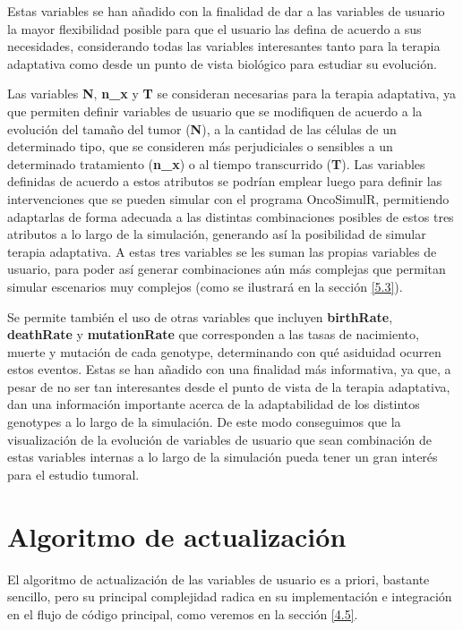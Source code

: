 Estas variables se han añadido con la finalidad de dar a las variables de usuario la mayor flexibilidad posible para que el usuario las defina de acuerdo a sus necesidades, considerando todas las variables interesantes tanto para la terapia adaptativa como desde un punto de vista biológico para estudiar su evolución.

Las variables \textbf{N}, \textbf{n\_x} y \textbf{T} se consideran necesarias para la terapia adaptativa, ya que permiten definir variables de usuario que se modifiquen de acuerdo a la evolución del tamaño del \gls{tumor} (\textbf{N}), a la cantidad de las células de un determinado tipo, que se consideren más perjudiciales o sensibles a un determinado tratamiento (\textbf{n\_x}) o al tiempo transcurrido (\textbf{T}). Las variables definidas de acuerdo a estos atributos se podrían emplear luego para definir las intervenciones que se pueden simular con el programa OncoSimulR\cite{OncoSimulR}, permitiendo adaptarlas de forma adecuada a las distintas combinaciones posibles de estos tres atributos a lo largo de la simulación, generando así la posibilidad de simular terapia adaptativa. A estas tres variables se les suman las propias variables de usuario, para poder así generar combinaciones aún más complejas que permitan simular escenarios muy complejos (como se ilustrará en la sección \ref{5.3}).

Se permite también el uso de otras variables que incluyen  \textbf{birthRate}, \textbf{deathRate} y \textbf{mutationRate} que corresponden a las tasas de nacimiento, muerte y mutación de cada \gls{genotype}, determinando con qué asiduidad ocurren estos eventos. Estas se han añadido con una finalidad más informativa, ya que, a pesar de no ser tan interesantes desde el punto de vista de la terapia adaptativa, dan una información importante acerca de la adaptabilidad de los distintos \glspl{genotype} a lo largo de la simulación. De este modo conseguimos que la visualización de la evolución de variables de usuario que sean combinación de estas variables internas a lo largo de la simulación pueda tener un gran interés para el estudio tumoral.

\section{Algoritmo de actualización}\label{3.4}

El algoritmo de actualización de las variables de usuario es a priori, bastante sencillo, pero su principal complejidad radica en su implementación e integración en el flujo de código principal, como veremos en la sección \ref{4.5}.

